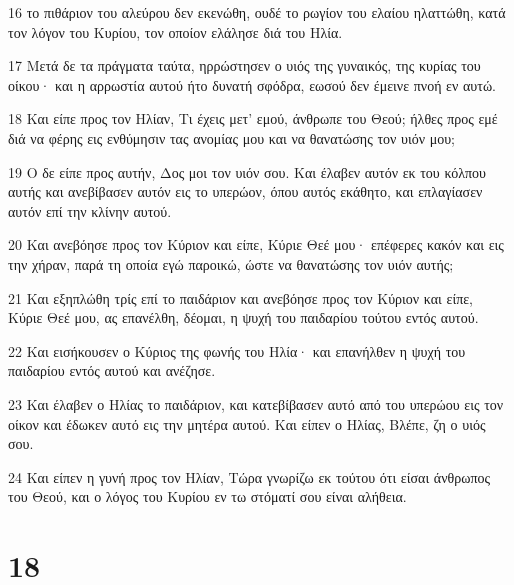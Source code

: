 \par 16 το πιθάριον του αλεύρου δεν εκενώθη, ουδέ το ρωγίον του ελαίου ηλαττώθη, κατά τον λόγον του Κυρίου, τον οποίον ελάλησε διά του Ηλία.
\par 17 Μετά δε τα πράγματα ταύτα, ηρρώστησεν ο υιός της γυναικός, της κυρίας του οίκου· και η αρρωστία αυτού ήτο δυνατή σφόδρα, εωσού δεν έμεινε πνοή εν αυτώ.
\par 18 Και είπε προς τον Ηλίαν, Τι έχεις μετ' εμού, άνθρωπε του Θεού; ήλθες προς εμέ διά να φέρης εις ενθύμησιν τας ανομίας μου και να θανατώσης τον υιόν μου;
\par 19 Ο δε είπε προς αυτήν, Δος μοι τον υιόν σου. Και έλαβεν αυτόν εκ του κόλπου αυτής και ανεβίβασεν αυτόν εις το υπερώον, όπου αυτός εκάθητο, και επλαγίασεν αυτόν επί την κλίνην αυτού.
\par 20 Και ανεβόησε προς τον Κύριον και είπε, Κύριε Θεέ μου· επέφερες κακόν και εις την χήραν, παρά τη οποία εγώ παροικώ, ώστε να θανατώσης τον υιόν αυτής;
\par 21 Και εξηπλώθη τρίς επί το παιδάριον και ανεβόησε προς τον Κύριον και είπε, Κύριε Θεέ μου, ας επανέλθη, δέομαι, η ψυχή του παιδαρίου τούτου εντός αυτού.
\par 22 Και εισήκουσεν ο Κύριος της φωνής του Ηλία· και επανήλθεν η ψυχή του παιδαρίου εντός αυτού και ανέζησε.
\par 23 Και έλαβεν ο Ηλίας το παιδάριον, και κατεβίβασεν αυτό από του υπερώου εις τον οίκον και έδωκεν αυτό εις την μητέρα αυτού. Και είπεν ο Ηλίας, Βλέπε, ζη ο υιός σου.
\par 24 Και είπεν η γυνή προς τον Ηλίαν, Τώρα γνωρίζω εκ τούτου ότι είσαι άνθρωπος του Θεού, και ο λόγος του Κυρίου εν τω στόματί σου είναι αλήθεια.

\chapter{18}

